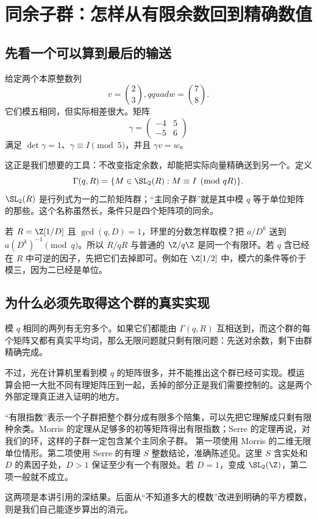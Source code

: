 \chapter{同余子群：怎样从有限余数回到精确数值}\label{ch:congruence}
\section{先看一个可以算到最后的输送}
给定两个本原整数列
\[v=\binom23,qquad w=\binom78.
\]
它们模五相同，但实际相差很大。矩阵
\[\gamma=\begin{pmatrix}-4&5\\-5&6\end{pmatrix}
\]
满足 $\det\gamma=1$、$\gamma\equiv I\pmod5$，并且 $\gamma v=w$。

这正是我们想要的工具：不改变指定余数，却能把实际向量精确送到另一个。定义
\[\Gamma(q,R)=\{M\in\SL_2(R):M\equiv I\pmod{qR}\}.
\]
$\SL_2(R)$ 是行列式为一的二阶矩阵群；“主同余子群”就是其中模 $q$ 等于单位矩阵的那些。这个名称虽然长，条件只是四个矩阵项的同余。

若 $R=\Z[1/D]$ 且 $\gcd(q,D)=1$，环里的分数怎样取模？把 $a/D^k$ 送到 $a(D^k)^{-1}\pmod q$。所以 $R/qR$ 与普通的 $\Z/q\Z$ 是同一个有限环。若 $q$ 含已经在 $R$ 中可逆的因子，先把它们去掉即可。例如在 $\Z[1/2]$ 中，模六的条件等价于模三，因为二已经是单位。

\section{为什么必须先取得这个群的真实实现}
模 $q$ 相同的两列有无穷多个。如果它们都能由 $\Gamma(q,R)$ 互相送到，而这个群的每个矩阵又都有真实平均词，那么无限问题就只剩有限问题：先送对余数，剩下由群精确完成。

不过，光在计算机里看到模 $q$ 的矩阵很多，并不能推出这个群已经可实现。模运算会把一大批不同有理矩阵压到一起，丢掉的部分正是我们需要控制的。这是两个外部定理真正进入证明的地方。

“有限指数”表示一个子群把整个群分成有限多个陪集，可以先把它理解成只剩有限种余类。Morris 的定理从足够多的初等矩阵得出有限指数；Serre 的定理再说，对我们的环，这样的子群一定包含某个主同余子群。
第一项使用 Morris\cite[Theorem 6.1(2)]{morris} 的二维无限单位情形。第二项使用 Serre\cite{serre} 的有理 $S$ 整数结论，准确陈述见\cite[pp.308--309]{prasad}。这里 $S$ 含实处和 $D$ 的素因子处，$D>1$ 保证至少有一个有限处。若 $D=1$，变成 $\SL_2(\Z)$，第二项一般就不成立。

这两项是本讲引用的深结果。后面从“不知道多大的模数”改进到明确的平方模数，则是我们自己能逐步算出的消元。

